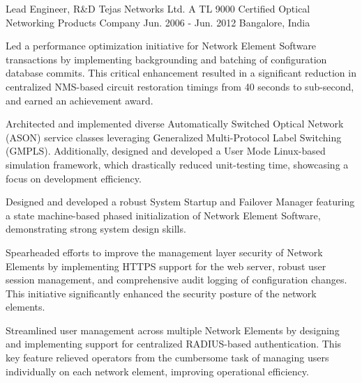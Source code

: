 \begin{cventries}
  \expentry
    {Lead Engineer, R\&D} %
    {Tejas Networks} {Ltd.} %
    {A TL 9000 Certified Optical Networking Products Company} %
    {Jun. 2006 - Jun. 2012} %
    {Bangalore, India} %
    {
      \begin{cvitems} %
        \item {Led a performance optimization initiative for Network Element Software transactions by implementing
		backgrounding and batching of configuration database commits. This critical enhancement resulted in
		a significant reduction in centralized NMS-based circuit restoration timings from 40 seconds to sub-second,
		and earned an achievement award.}
        \item {Architected and implemented diverse Automatically Switched Optical Network (ASON) service classes
		leveraging Generalized Multi-Protocol Label Switching (GMPLS). Additionally, designed and developed
		a User Mode Linux-based simulation framework, which drastically reduced unit-testing time, showcasing
		a focus on development efficiency.}
	\item {Designed and developed a robust System Startup and Failover Manager featuring a state machine-based
		phased initialization of Network Element Software, demonstrating strong system design skills.}
	\item {Spearheaded efforts to improve the management layer security of Network Elements by implementing HTTPS
		support for the web server, robust user session management, and comprehensive audit logging of configuration
		changes. This initiative significantly enhanced the security posture of the network elements.}
	\item {Streamlined user management across multiple Network Elements by designing and implementing support for
		centralized RADIUS-based authentication. This key feature relieved operators from the cumbersome task of
		managing users individually on each network element, improving operational efficiency.}
      \end{cvitems}
    }

\end{cventries}
